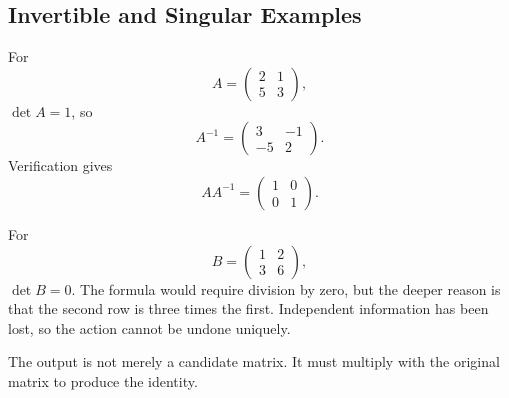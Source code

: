 \subsection{Invertible and Singular Examples}

\begin{examplebox}
For
\[
A=\begin{pmatrix}2&1\\5&3\end{pmatrix},
\]
$\det A=1$, so
\[
A^{-1}=\begin{pmatrix}3&-1\\-5&2\end{pmatrix}.
\]
Verification gives
\[
AA^{-1}=\begin{pmatrix}1&0\\0&1\end{pmatrix}.
\]
\end{examplebox}

\begin{examplebox}
For
\[
B=\begin{pmatrix}1&2\\3&6\end{pmatrix},
\]
$\det B=0$. The formula would require division by zero, but the deeper reason is that the second row is three times the first. Independent information has been lost, so the action cannot be undone uniquely.
\end{examplebox}

\begin{remarkbox}
The output is not merely a candidate matrix. It must multiply with the original matrix to produce the identity.
\end{remarkbox}
